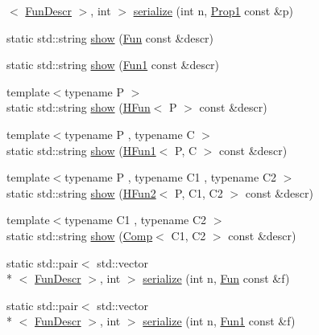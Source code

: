 \begin{DoxyCompactItemize}
$<$ \hyperlink{structpfq__lang_1_1FunDescr}{Fun\-Descr} $>$, int $>$ \hyperlink{namespacepfq__lang_1_1term_a4c143ee066b92bd8578432f7436026fb}{serialize} (int n, \hyperlink{structpfq__lang_1_1term_1_1Prop1}{Prop1} const \&p)
\item 
static std\-::string \hyperlink{namespacepfq__lang_1_1term_a2df94c2f5eb6ffb6ebd83f79b5c8008d}{show} (\hyperlink{structpfq__lang_1_1term_1_1Fun}{Fun} const \&descr)
\item 
static std\-::string \hyperlink{namespacepfq__lang_1_1term_a9d1a9154aa159b08768c01512719b89c}{show} (\hyperlink{structpfq__lang_1_1term_1_1Fun1}{Fun1} const \&descr)
\item 
{\footnotesize template$<$typename P $>$ }\\static std\-::string \hyperlink{namespacepfq__lang_1_1term_ac7f23df160e54271a796e8ccc76f91c7}{show} (\hyperlink{structpfq__lang_1_1term_1_1HFun}{H\-Fun}$<$ P $>$ const \&descr)
\item 
{\footnotesize template$<$typename P , typename C $>$ }\\static std\-::string \hyperlink{namespacepfq__lang_1_1term_ae2a6d9f12c95a5316525427683048cba}{show} (\hyperlink{structpfq__lang_1_1term_1_1HFun1}{H\-Fun1}$<$ P, C $>$ const \&descr)
\item 
{\footnotesize template$<$typename P , typename C1 , typename C2 $>$ }\\static std\-::string \hyperlink{namespacepfq__lang_1_1term_a15b3d8fa4a86e40ae3aa958cf117ed96}{show} (\hyperlink{structpfq__lang_1_1term_1_1HFun2}{H\-Fun2}$<$ P, C1, C2 $>$ const \&descr)
\item 
{\footnotesize template$<$typename C1 , typename C2 $>$ }\\static std\-::string \hyperlink{namespacepfq__lang_1_1term_a456b08214b3ca481370b19c356fe72a1}{show} (\hyperlink{structpfq__lang_1_1term_1_1Comp}{Comp}$<$ C1, C2 $>$ const \&descr)
\item 
static std\-::pair$<$ std\-::vector\\*
$<$ \hyperlink{structpfq__lang_1_1FunDescr}{Fun\-Descr} $>$, int $>$ \hyperlink{namespacepfq__lang_1_1term_aa575bd934906ada0e096c73f4a8c3178}{serialize} (int n, \hyperlink{structpfq__lang_1_1term_1_1Fun}{Fun} const \&f)
\item 
static std\-::pair$<$ std\-::vector\\*
$<$ \hyperlink{structpfq__lang_1_1FunDescr}{Fun\-Descr} $>$, int $>$ \hyperlink{namespacepfq__lang_1_1term_a0a5684fae11ed300d52a262fcfd3dcba}{serialize} (int n, \hyperlink{structpfq__lang_1_1term_1_1Fun1}{Fun1} const \&f)

\end{DoxyCompactItemize}
